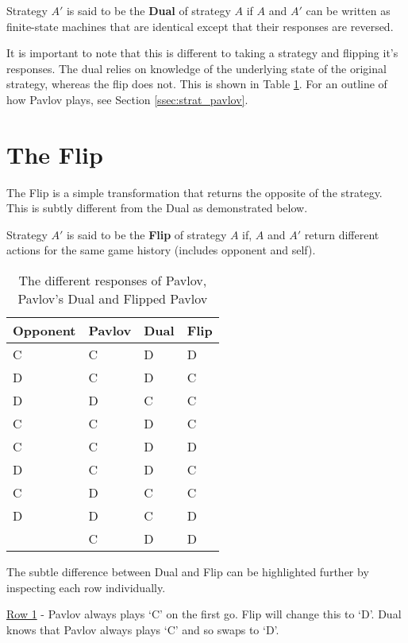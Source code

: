 \begin{definition}\label{def:dual}
Strategy $A'$ is said to be the \textbf{Dual} of strategy $A$ if $A$ and $A'$ can be written as finite-state machines that are identical except that their responses are reversed.
\end{definition}

It is important to note that this is different to taking a strategy and flipping it's responses.
The dual relies on knowledge of the underlying state of the original strategy, whereas the flip does not.
This is shown in Table \ref{tab:strat-dual-flip}.
For an outline of how Pavlov plays, see Section \ref{ssec:strat_pavlov}.

\section{The Flip}\label{sec:flip}
The Flip is a simple transformation that returns the opposite of the strategy.
This is subtly different from the Dual as demonstrated below.

\begin{definition}\label{def:flip}
Strategy $A'$ is said to be the \textbf{Flip} of strategy $A$ if, $A$ and $A'$ return different actions for the same game history (includes opponent and self).
\end{definition}

\begin{table}[htbp]
\centering
\begin{tabular}{l l l l}
\toprule
Opponent & Pavlov & Dual & Flip \\
\midrule
C & C & D & D \\
D & C & D & C \\
D & D & C & C \\
C & C & D & C \\
C & C & D & D \\
D & C & D & C \\
C & D & C & C \\
D & D & C & D \\
  & C & D & D \\
\bottomrule
\end{tabular}
\caption{The different responses of Pavlov, Pavlov's Dual and Flipped Pavlov}
\label{tab:strat-dual-flip}
\end{table}

The subtle difference between Dual and Flip can be highlighted further by inspecting each row individually.

\underline{Row 1} - Pavlov always plays `C' on the first go.
Flip will change this to `D'.
Dual knows that Pavlov always plays `C' and so swaps to `D'.

